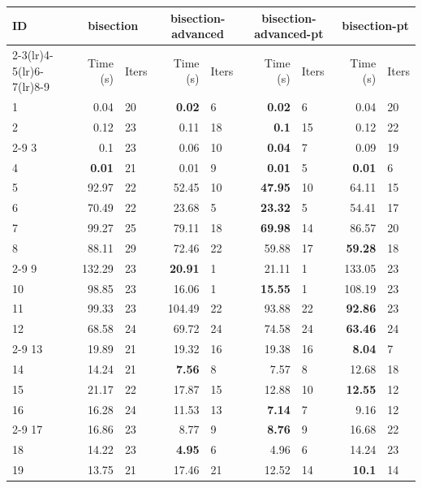 \begin{longtable}{lr@{\hskip 4pt}l@{\hskip 12pt}r@{\hskip 4pt}l@{\hskip 12pt}r@{\hskip 4pt}l@{\hskip 12pt}r@{\hskip 4pt}l@{\hskip 12pt}}
\toprule
ID & \multicolumn{2}{c}{bisection} & \multicolumn{2}{c}{bisection-advanced} & \multicolumn{2}{c}{bisection-advanced-pt} & \multicolumn{2}{c}{bisection-pt} \\
\cmidrule(lr){2-3}\cmidrule(lr){4-5}\cmidrule(lr){6-7}\cmidrule(lr){8-9}
 & Time (s) &  Iters & Time (s) &  Iters & Time (s) &  Iters & Time (s) &  Iters \\
\midrule
\endhead
1 & 0.04 & 20 & \textbf{0.02} & 6 & \textbf{0.02} & 6 & 0.04 & 20 \\
2 & 0.12 & 23 & 0.11 & 18 & \textbf{0.1} & 15 & 0.12 & 22 \\
\cmidrule{2-9}
3 & 0.1 & 23 & 0.06 & 10 & \textbf{0.04} & 7 & 0.09 & 19 \\
4 & \textbf{0.01} & 21 & 0.01 & 9 & \textbf{0.01} & 5 & \textbf{0.01} & 6 \\
\midrule
5 & 92.97 & 22 & 52.45 & 10 & \textbf{47.95} & 10 & 64.11 & 15 \\
6 & 70.49 & 22 & 23.68 & 5 & \textbf{23.32} & 5 & 54.41 & 17 \\
7 & 99.27 & 25 & 79.11 & 18 & \textbf{69.98} & 14 & 86.57 & 20 \\
8 & 88.11 & 29 & 72.46 & 22 & 59.88 & 17 & \textbf{59.28} & 18 \\
\cmidrule{2-9}
9 & 132.29 & 23 & \textbf{20.91} & 1 & 21.11 & 1 & 133.05 & 23 \\
10 & 98.85 & 23 & 16.06 & 1 & \textbf{15.55} & 1 & 108.19 & 23 \\
11 & 99.33 & 23 & 104.49 & 22 & 93.88 & 22 & \textbf{92.86} & 23 \\
12 & 68.58 & 24 & 69.72 & 24 & 74.58 & 24 & \textbf{63.46} & 24 \\
\cmidrule{2-9}
13 & 19.89 & 21 & 19.32 & 16 & 19.38 & 16 & \textbf{8.04} & 7 \\
14 & 14.24 & 21 & \textbf{7.56} & 8 & 7.57 & 8 & 12.68 & 18 \\
15 & 21.17 & 22 & 17.87 & 15 & 12.88 & 10 & \textbf{12.55} & 12 \\
16 & 16.28 & 24 & 11.53 & 13 & \textbf{7.14} & 7 & 9.16 & 12 \\
\cmidrule{2-9}
17 & 16.86 & 23 & 8.77 & 9 & \textbf{8.76} & 9 & 16.68 & 22 \\
18 & 14.22 & 23 & \textbf{4.95} & 6 & 4.96 & 6 & 14.24 & 23 \\
19 & 13.75 & 21 & 17.46 & 21 & 12.52 & 14 & \textbf{10.1} & 14 \\

\end{longtable}

